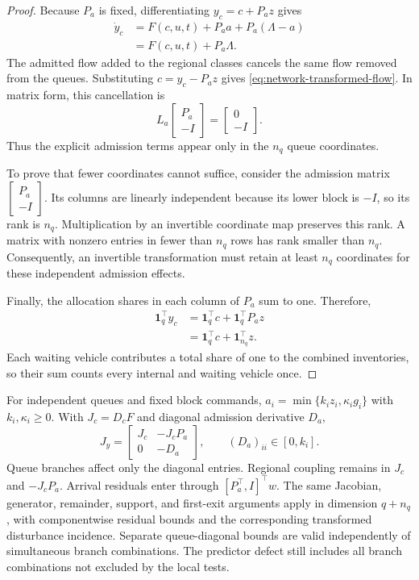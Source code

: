 \documentclass[preprint,12pt]{elsarticle}
\begin{document}
\begin{proof}
Because $P_a$ is fixed, differentiating $y_c=c+P_a z$ gives
\[
\begin{aligned}
 \dot y_c
 &=F(c,u,t)+P_a a+P_a(\Lambda-a)\\
 &=F(c,u,t)+P_a\Lambda.
\end{aligned}
\]
The admitted flow added to the regional classes cancels the same flow
removed from the queues. Substituting $c=y_c-P_a z$ gives
\eqref{eq:network-transformed-flow}. In matrix form, this cancellation is
\[
 L_a\begin{bmatrix}P_a\\-I\end{bmatrix}
 =\begin{bmatrix}0\\-I\end{bmatrix}.
\]
Thus the explicit admission terms appear only in the $n_q$ queue
coordinates.

To prove that fewer coordinates cannot suffice, consider the admission
matrix $\begin{bmatrix}P_a\\-I\end{bmatrix}$. Its columns are linearly
independent because its lower block is $-I$, so its rank is $n_q$.
Multiplication by an invertible coordinate map preserves this rank.
A matrix with nonzero entries in fewer than $n_q$ rows has rank smaller
than $n_q$. Consequently, an invertible transformation must retain at
least $n_q$ coordinates for these independent admission effects.

Finally, the allocation shares in each column of $P_a$ sum to one.
Therefore,
\[
\begin{aligned}
 \mathbf1_q^\top y_c
 &=\mathbf1_q^\top c+\mathbf1_q^\top P_a z\\
 &=\mathbf1_q^\top c+\mathbf1_{n_q}^\top z.
\end{aligned}
\]
Each waiting vehicle contributes a total share of one to the combined
inventories, so their sum counts every internal and waiting vehicle once.
\end{proof}

For independent queues and fixed block commands,
$a_i=\min\{k_i z_i,\kappa_i g_i\}$ with $k_i,\kappa_i\ge0$. With
$J_c=D_cF$ and diagonal admission derivative $D_a$,
\begin{equation}
 J_y=\begin{bmatrix}J_c&-J_cP_a\\0&-D_a\end{bmatrix},
 \qquad (D_a)_{ii}\in[0,k_i].
 \label{eq:network-jacobian}
\end{equation}
Queue branches affect only the diagonal entries. Regional coupling remains
in $J_c$ and $-J_cP_a$. Arrival residuals enter through
$[P_a^\top,I]^\top w$. The same Jacobian, generator, remainder, support,
and first-exit arguments apply in dimension $q+n_q$, with componentwise
residual bounds and the corresponding transformed disturbance incidence.
Separate queue-diagonal bounds are valid independently of simultaneous
branch combinations. The predictor defect still includes all branch
combinations not excluded by the local tests.
\end{document}
